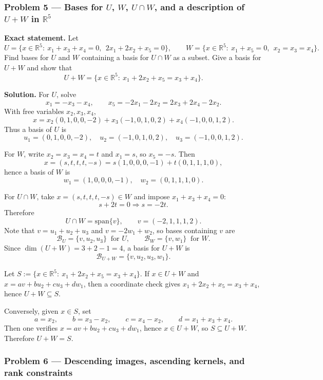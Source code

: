\documentclass[12pt,a4paper]{article}
\theoremstyle{plain}
\theoremstyle{definition}      %
\begin{document}
\bigskip

\subsubsection*{Problem 5 — Bases for $U$, $W$, $U\cap W$, and a description of $U+W$ in $\mathbb R^5$}

\textbf{Exact statement.}
Let
\[
U=\{x\in\mathbb R^5:\ x_1+x_3+x_4=0,\ \ 2x_1+2x_2+x_5=0\},\qquad
W=\{x\in\mathbb R^5:\ x_1+x_5=0,\ \ x_2=x_3=x_4\}.
\]
Find bases for $U$ and $W$ containing a basis for $U\cap W$ as a subset.
Give a basis for $U+W$ and show that
\[
U+W=\{x\in\mathbb R^5:\ x_1+2x_2+x_5=x_3+x_4\}.
\]

\textbf{Solution.}
For $U$, solve
\[
x_1=-x_3-x_4,\qquad x_5=-2x_1-2x_2=2x_3+2x_4-2x_2.
\]
With free variables $x_2,x_3,x_4$,
\[
x=x_2(0,1,0,0,-2)+x_3(-1,0,1,0,2)+x_4(-1,0,0,1,2).
\]
Thus a basis of $U$ is
\[
u_1=(0,1,0,0,-2),\quad u_2=(-1,0,1,0,2),\quad u_3=(-1,0,0,1,2).
\]

For $W$, write $x_2=x_3=x_4=t$ and $x_1=s$, so $x_5=-s$. Then
\[
x=(s,t,t,t,-s)=s(1,0,0,0,-1)+t(0,1,1,1,0),
\]
hence a basis of $W$ is
\[
w_1=(1,0,0,0,-1),\quad w_2=(0,1,1,1,0).
\]

For $U\cap W$, take $x=(s,t,t,t,-s)\in W$ and impose $x_1+x_3+x_4=0$:
\[
s+2t=0\Rightarrow s=-2t.
\]
Therefore
\[
U\cap W=\mathrm{span}\{v\},\qquad v=(-2,1,1,1,2).
\]
Note that $v=u_1+u_2+u_3$ and $v=-2w_1+w_2$, so bases containing $v$ are
\[
\mathcal B_U=\{v,u_2,u_3\}\ \text{ for }U,\qquad \mathcal B_W=\{v,w_1\}\ \text{ for }W.
\]
Since $\dim(U+W)=3+2-1=4$, a basis for $U+W$ is
\[
\mathcal B_{U+W}=\{v,u_2,u_3,w_1\}.
\]

Let $S:=\{x\in\mathbb R^5:\ x_1+2x_2+x_5=x_3+x_4\}$.
If $x\in U+W$ and $x=a v+b u_2+c u_3+d w_1$, then a coordinate check gives
$x_1+2x_2+x_5=x_3+x_4$, hence $U+W\subseteq S$.

Conversely, given $x\in S$, set
\[
a=x_2,\qquad b=x_3-x_2,\qquad c=x_4-x_2,\qquad d=x_1+x_3+x_4.
\]
Then one verifies $x=a v+b u_2+c u_3+d w_1$, hence $x\in U+W$, so $S\subseteq U+W$.
Therefore $U+W=S$.

\bigskip

\subsubsection*{Problem 6 — Descending images, ascending kernels, and rank constraints}
\end{document}
